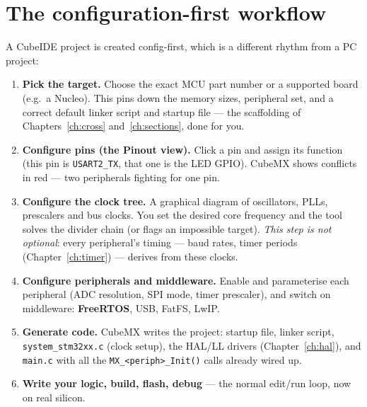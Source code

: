 \documentclass[11pt,a4paper,oneside]{book}
\newcommand{\code}[1]{\texttt{#1}}
\begin{document}
\section{The configuration-first workflow}
A CubeIDE project is created config-first, which is a different rhythm from a
PC project:
\begin{enumerate}[leftmargin=1.5cm]
  \item \textbf{Pick the target.} Choose the exact MCU part number or a
        supported board (e.g.\ a Nucleo). This pins down the memory sizes,
        peripheral set, and a correct default linker script and startup file ---
        the scaffolding of Chapters~\ref{ch:cross} and~\ref{ch:sections}, done
        for you.
  \item \textbf{Configure pins (the Pinout view).} Click a pin and assign its
        function (this pin is \code{USART2\_TX}, that one is the LED GPIO).
        CubeMX shows conflicts in red --- two peripherals fighting for one pin.
  \item \textbf{Configure the clock tree.} A graphical diagram of oscillators,
        PLLs, prescalers and bus clocks. You set the desired core frequency and
        the tool solves the divider chain (or flags an impossible target).
        \emph{This step is not optional}: every peripheral's timing --- baud
        rates, timer periods (Chapter~\ref{ch:timer}) --- derives from these
        clocks.
  \item \textbf{Configure peripherals and middleware.} Enable and parameterise
        each peripheral (ADC resolution, SPI mode, timer prescaler), and switch
        on middleware: \textbf{FreeRTOS}, USB, FatFS, LwIP.
  \item \textbf{Generate code.} CubeMX writes the project: startup file, linker
        script, \code{system\_stm32xx.c} (clock setup), the HAL/LL drivers
        (Chapter~\ref{ch:hal}), and \code{main.c} with all the
        \code{MX\_<periph>\_Init()} calls already wired up.
  \item \textbf{Write your logic, build, flash, debug} --- the normal edit/run
        loop, now on real silicon.
\end{enumerate}
\end{document}
